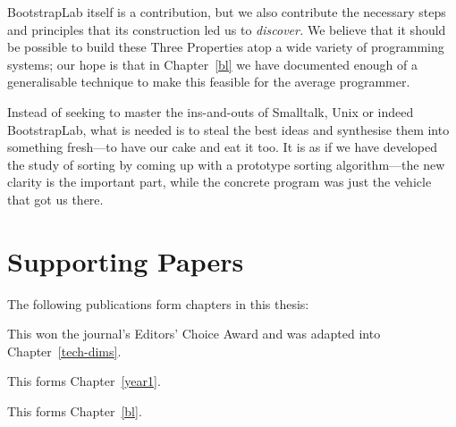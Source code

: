 
BootstrapLab itself is a contribution, but we also contribute the
necessary steps and principles that its construction led us to
\emph{discover.} We believe that it should be possible to build these
Three Properties atop a wide variety of programming systems; our hope is
that in Chapter~\ref{bl} we have documented enough of a generalisable
technique to make this feasible for the average programmer.

Instead of seeking to master the ins-and-outs of Smalltalk, Unix or
indeed BootstrapLab, what is needed is to steal the best ideas and
synthesise them into something fresh---to have our cake and eat it too.
It is as if we have developed the study of sorting by coming up with a
prototype sorting algorithm---the new clarity is the important part,
while the concrete program was just the vehicle that got us there.

\hypertarget{supporting-papers}{%
\section{Supporting Papers}\label{supporting-papers}}

The following publications form chapters in this thesis:


This won the journal's Editors' Choice Award and was adapted into
Chapter~\ref{tech-dims}.


This forms Chapter~\ref{year1}.


This forms Chapter~\ref{bl}.

